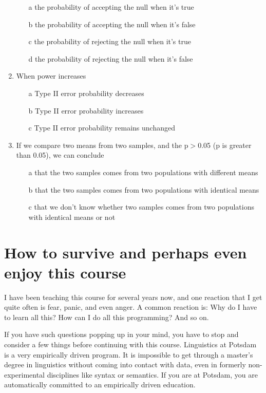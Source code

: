 \documentclass[12pt]{book}
\begin{document}
\begin{enumerate}
\begin{enumerate}
\item[a]
the probability of accepting the null when it's true
\item[b]
the probability of accepting the null when it's false
\item[c]
the probability of rejecting the null when it's true
\item[d]
the probability of rejecting the null when it's false
\end{enumerate}

\item
When power increases
\begin{enumerate}
\item[a]
Type II error probability decreases
\item[b]
Type II error probability increases
\item[c]
Type II error probability remains unchanged
\end{enumerate}

\item
If we compare two means from two samples, and the p$>$0.05 (p is greater than 0.05), we can conclude 

\begin{enumerate}
\item[a]
that the two samples comes from two populations with different means
\item[b]
 that the two samples comes from two populations with identical means
\item[c]
that we don't know whether two samples comes from two populations with identical means or not
\end{enumerate}
\end{enumerate}

\section{How to survive and perhaps even enjoy this course}

I have been teaching this course for several years now, and one reaction that I get quite often is fear, panic, and even anger.
A common reaction is: Why do I have to learn all this? How can I do all this programming? And so on. 

If you have such questions popping up in your mind, you have to stop and consider a few things before continuing with this course.  
Linguistics at Potsdam is a very empirically driven program. It is impossible to get through a master's degree in linguistics without coming into contact with data, even in formerly non-experimental disciplines like syntax or semantics. If you are at Potsdam, you are automatically committed to an empirically driven education. 
\end{document}
